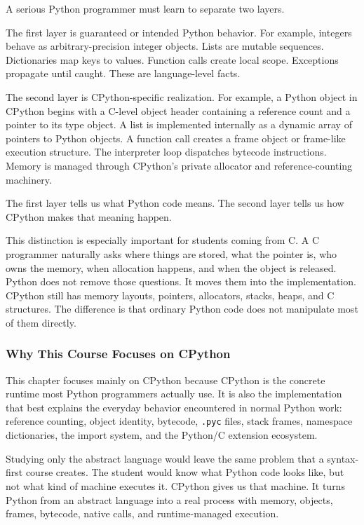 A serious Python programmer must learn to separate two layers.

The first layer is guaranteed or intended Python behavior. For example, integers behave as arbitrary-precision integer objects. Lists are mutable sequences. Dictionaries map keys to values. Function calls create local scope. Exceptions propagate until caught. These are language-level facts.

The second layer is CPython-specific realization. For example, a Python object in CPython begins with a C-level object header containing a reference count and a pointer to its type object. A list is implemented internally as a dynamic array of pointers to Python objects. A function call creates a frame object or frame-like execution structure. The interpreter loop dispatches bytecode instructions. Memory is managed through CPython's private allocator and reference-counting machinery.

The first layer tells us what Python code means. The second layer tells us how CPython makes that meaning happen.

This distinction is especially important for students coming from C. A C programmer naturally asks where things are stored, what the pointer is, who owns the memory, when allocation happens, and when the object is released. Python does not remove those questions. It moves them into the implementation. CPython still has memory layouts, pointers, allocators, stacks, heaps, and C structures. The difference is that ordinary Python code does not manipulate most of them directly.

\subsubsection{Why This Course Focuses on CPython}

This chapter focuses mainly on CPython because CPython is the concrete runtime most Python programmers actually use. It is also the implementation that best explains the everyday behavior encountered in normal Python work: reference counting, object identity, bytecode, \texttt{.pyc} files, stack frames, namespace dictionaries, the import system, and the Python/C extension ecosystem.

Studying only the abstract language would leave the same problem that a syntax-first course creates. The student would know what Python code looks like, but not what kind of machine executes it. CPython gives us that machine. It turns Python from an abstract language into a real process with memory, objects, frames, bytecode, native calls, and runtime-managed execution.

